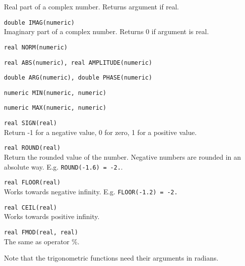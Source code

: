 \begin{description}
    Real part of a complex number. Returns argument if real.
  \item[] \texttt{double IMAG(numeric)}\\
    Imaginary part of a complex number. Returns 0 if argument is real.
  \item[] \texttt{real NORM(numeric)}
  \item[] \texttt{real ABS(numeric),  real AMPLITUDE(numeric)}
  \item[] \texttt{double ARG(numeric),  double PHASE(numeric)}
  \item[] \texttt{numeric MIN(numeric, numeric)}
  \item[] \texttt{numeric MAX(numeric, numeric)}
  \item[] \texttt{real SIGN(real)}\\
    Return -1 for a negative value, 0 for zero, 1 for a positive value.
  \item[] \texttt{real ROUND(real)}\\
    Return the rounded value of the number. Negative numbers are
    rounded in an absolute way.
    E.g. \texttt{ROUND(-1.6) = -2.}.
  \item[] \texttt{real FLOOR(real)}\\
    Works towards negative infinity.
    E.g. \texttt{FLOOR(-1.2) = -2.}
  \item[] \texttt{real CEIL(real)}\\
    Works towards positive infinity.
  \item[] \texttt{real FMOD(real, real)}\\
    The same as operator \%.
\end{description}
Note that the trigonometric functions need their arguments in radians.

